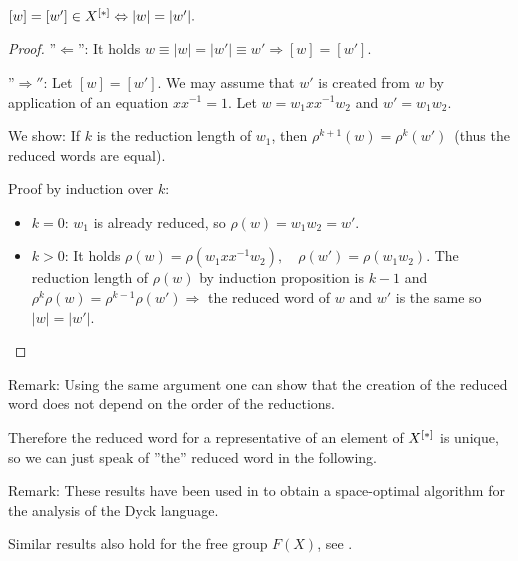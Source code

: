 \bigskip

\begin{lemma}
$ [w] = [w'] \in \mbox{${X}^{[*]}$} \Leftrightarrow |w| = |w'|.$
\end{lemma}

\begin{proof}
''$\Leftarrow$'': It holds $w \equiv |w| = |w'| \equiv w' \Rightarrow [w] =
[w']$.

''$\Rightarrow''$: Let $[w] = [w']$. We may assume that $w'$ is created from $w$
by application of an equation $x x^{-1} = 1$. Let $w = w_1 x x^{-1} w_2$ and $w' = w_1 w_2$.

We show: If $k$ is the reduction length of $w_1$, then $\rho^{k+1}(w) =
\rho^k(w')$\ (thus the reduced words are equal).

Proof by induction over $k$:
\begin{itemize}
  \item  $k = 0$: $w_1$ is already reduced, so $\rho(w) = w_1 w_2 = w'$.
  \item $k > 0$: It holds $\rho(w) = \rho(w_1 x x^{-1} w_2), \quad \rho(w') = \rho(w_1
w_2)$. The reduction length of $\rho(w)$ by induction proposition is $k-1$ and
$\rho^k \rho(w) = \rho^{k-1}\rho(w') \Rightarrow$ the reduced word of $w$ and
$w'$ is the same so $|w| = |w'|$.
\end{itemize}
\end{proof}

Remark: Using the same argument one can show that the creation of the reduced
word does not depend on the order of the reductions.

Therefore the reduced word for a representative of an element of $\mbox{${X}^{[*]}$}$ is
unique, so we can just speak of ''the'' reduced word in the following.

Remark: These results have been used in \cite{HotzMesserschmidt} to obtain a
space-optimal algorithm for the analysis of the Dyck language.

Similar results also hold for the free group $F(X)$, see \cite{CrowellFox}.

